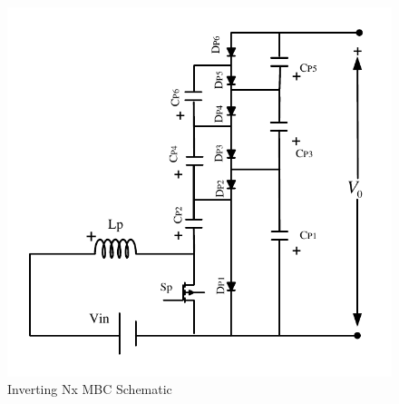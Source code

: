 \begin{figure}[H]
   \centering
   \includegraphics[width=\textwidth]{figures/yMultilevel/InvertingMBCforReport2.pdf}
    \caption{Inverting Nx MBC Schematic}
	\label{fig:MBC_InvertingNx}
\end{figure}

